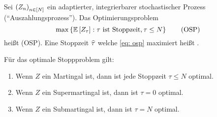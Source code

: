 \begin{*definition}
	Sei $\left( Z_n \right)_{n \in [N]}$ ein adaptierter, integrierbarer stochastischer Prozess (\enquote{Auszahlungsprozess}). Das Optimierungsproblem 
	\begin{equation*}
		\max\left\{ \mathbb{E} \left[ Z_\tau \right] : \tau \text{ ist Stoppzeit}, \tau \le N \right\}
		\tag{OSP} \label{eq: osp}
	\end{equation*} 
	heißt  (OSP). Eine Stoppzeit $\widehat{\tau}$ welche \eqref{eq: osp} maximiert heißt .
\end{*definition}

\begin{lemma} %
	\label{lemma: 6.2}
	Für das optimale Stoppproblem gilt:
	\begin{enumerate}[label=(\alph*), nolistsep, topsep=-\parskip]
		\item Wenn $Z$ ein Martingal ist, dann ist jede Stoppzeit $\tau \le N$ optimal.
		\item Wenn $Z$ ein Supermartingal ist, dann ist $\tau = 0$ optimal.
		\item Wenn $Z$ ein Submartingal ist, dann ist $\tau = N$ optimal.
	\end{enumerate}
\end{lemma}
